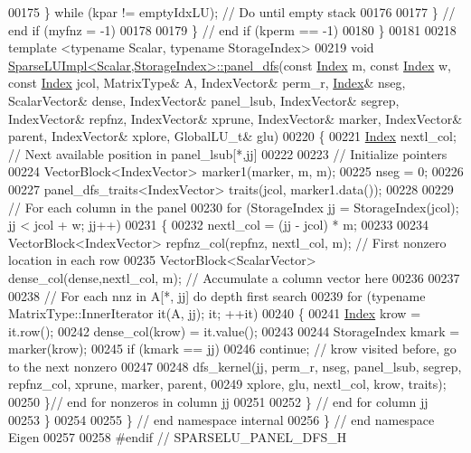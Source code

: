 \begin{DoxyCode}
00175       \} \textcolor{keywordflow}{while} (kpar != emptyIdxLU); \textcolor{comment}{// Do until empty stack }
00176       
00177     \} \textcolor{comment}{// end if (myfnz = -1)}
00178 
00179   \} \textcolor{comment}{// end if (kperm == -1)   }
00180 \}
00181 
00218 \textcolor{keyword}{template} <\textcolor{keyword}{typename} Scalar, \textcolor{keyword}{typename} StorageIndex>
00219 \textcolor{keywordtype}{void} \hyperlink{group___sparse_l_u___module_acaf62fda387ea03e9caa2734e4e7b0c9}{SparseLUImpl<Scalar,StorageIndex>::panel\_dfs}(\textcolor{keyword}{const} 
      \hyperlink{namespace_eigen_a62e77e0933482dafde8fe197d9a2cfde}{Index} m, \textcolor{keyword}{const} \hyperlink{namespace_eigen_a62e77e0933482dafde8fe197d9a2cfde}{Index} w, \textcolor{keyword}{const} \hyperlink{namespace_eigen_a62e77e0933482dafde8fe197d9a2cfde}{Index} jcol, MatrixType& A, IndexVector& perm\_r, 
      \hyperlink{namespace_eigen_a62e77e0933482dafde8fe197d9a2cfde}{Index}& nseg, ScalarVector& dense, IndexVector& panel\_lsub, IndexVector& segrep, IndexVector& repfnz, 
      IndexVector& xprune, IndexVector& marker, IndexVector& parent, IndexVector& xplore, GlobalLU\_t& glu)
00220 \{
00221   \hyperlink{namespace_eigen_a62e77e0933482dafde8fe197d9a2cfde}{Index} nextl\_col; \textcolor{comment}{// Next available position in panel\_lsub[*,jj] }
00222   
00223   \textcolor{comment}{// Initialize pointers }
00224   VectorBlock<IndexVector> marker1(marker, m, m); 
00225   nseg = 0; 
00226   
00227   panel\_dfs\_traits<IndexVector> traits(jcol, marker1.data());
00228   
00229   \textcolor{comment}{// For each column in the panel }
00230   \textcolor{keywordflow}{for} (StorageIndex jj = StorageIndex(jcol); jj < jcol + w; jj++) 
00231   \{
00232     nextl\_col = (jj - jcol) * m; 
00233     
00234     VectorBlock<IndexVector> repfnz\_col(repfnz, nextl\_col, m); \textcolor{comment}{// First nonzero location in each row}
00235     VectorBlock<ScalarVector> dense\_col(dense,nextl\_col, m); \textcolor{comment}{// Accumulate a column vector here}
00236     
00237     
00238     \textcolor{comment}{// For each nnz in A[*, jj] do depth first search}
00239     \textcolor{keywordflow}{for} (\textcolor{keyword}{typename} MatrixType::InnerIterator it(A, jj); it; ++it)
00240     \{
00241       \hyperlink{namespace_eigen_a62e77e0933482dafde8fe197d9a2cfde}{Index} krow = it.row(); 
00242       dense\_col(krow) = it.value();
00243       
00244       StorageIndex kmark = marker(krow); 
00245       \textcolor{keywordflow}{if} (kmark == jj) 
00246         \textcolor{keywordflow}{continue}; \textcolor{comment}{// krow visited before, go to the next nonzero}
00247       
00248       dfs\_kernel(jj, perm\_r, nseg, panel\_lsub, segrep, repfnz\_col, xprune, marker, parent,
00249                    xplore, glu, nextl\_col, krow, traits);
00250     \}\textcolor{comment}{// end for nonzeros in column jj}
00251     
00252   \} \textcolor{comment}{// end for column jj}
00253 \}
00254 
00255 \} \textcolor{comment}{// end namespace internal}
00256 \} \textcolor{comment}{// end namespace Eigen}
00257 
00258 \textcolor{preprocessor}{#endif // SPARSELU\_PANEL\_DFS\_H}
\end{DoxyCode}
